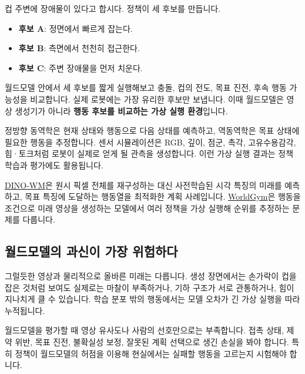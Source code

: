 \documentclass[11pt,openany]{book}
\begin{document}
\begin{examplebox}
컵 주변에 장애물이 있다고 합시다. 정책이 세 후보를 만듭니다.

\begin{itemize}
  \item \textbf{후보 A}: 정면에서 빠르게 잡는다.
  \item \textbf{후보 B}: 측면에서 천천히 접근한다.
  \item \textbf{후보 C}: 주변 장애물을 먼저 치운다.
\end{itemize}

월드모델 안에서 세 후보를 짧게 실행해보고 충돌, 컵의 전도, 목표 진전, 후속 행동 가능성을 비교합니다. 실제 로봇에는 가장 유리한 후보만 보냅니다. 이때 월드모델은 영상 생성기가 아니라 \textbf{행동 후보를 비교하는 가상 실행 환경}입니다.
\end{examplebox}

정방향 동역학은 현재 상태와 행동으로 다음 상태를 예측하고, 역동역학은 목표 상태에 필요한 행동을 추정합니다. 센서 시뮬레이션은 RGB, 깊이, 점군, 촉각, 고유수용감각, 힘·토크처럼 로봇이 실제로 얻게 될 관측을 생성합니다. 이런 가상 실행 결과는 정책 학습과 평가에도 활용됩니다.

\href{https://proceedings.mlr.press/v267/zhou25t.html}{DINO-WM}은 원시 픽셀 전체를 재구성하는 대신 사전학습된 시각 특징의 미래를 예측하고, 목표 특징에 도달하는 행동열을 최적화한 계획 사례입니다. \href{https://arxiv.org/abs/2506.00613}{WorldGym}은 행동을 조건으로 미래 영상을 생성하는 모델에서 여러 정책을 가상 실행해 순위를 추정하는 문제를 다룹니다.

\subsection*{월드모델의 과신이 가장 위험하다}

그럴듯한 영상과 물리적으로 올바른 미래는 다릅니다. 생성 장면에서는 손가락이 컵을 잡은 것처럼 보여도 실제로는 마찰이 부족하거나, 기하 구조가 서로 관통하거나, 힘이 지나치게 클 수 있습니다. 학습 분포 밖의 행동에서는 모델 오차가 긴 가상 실행을 따라 누적됩니다.

\begin{cautionbox}
월드모델을 평가할 때 영상 유사도나 사람의 선호만으로는 부족합니다. 접촉 상태, 제약 위반, 목표 진전, 불확실성 보정, 잘못된 계획 선택으로 생긴 손실을 봐야 합니다. 특히 정책이 월드모델의 허점을 이용해 현실에서는 실패할 행동을 고르는지 시험해야 합니다.
\end{cautionbox}
\end{document}
